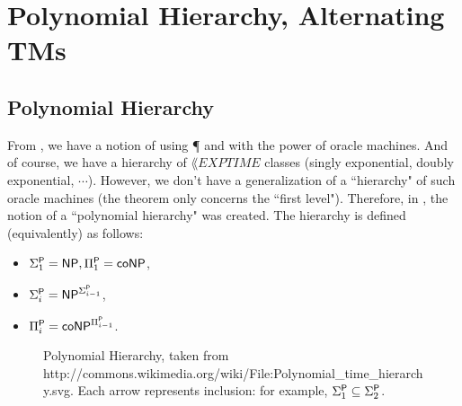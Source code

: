 \section{Polynomial Hierarchy, Alternating TMs}

\subsection{Polynomial Hierarchy}

From , we have a notion of using {\P} and {\NP} with the power of oracle machines. And of course, we have a hierarchy of $\lang{EXPTIME}$ classes (singly exponential, doubly exponential, $\cdots$). However, we don't have a generalization of a ``hierarchy" of such oracle machines (the theorem only concerns the ``first level"). Therefore, in \cite{originalpolyhierarchypaper}, the notion of a ``polynomial hierarchy" was created. The hierarchy is defined (equivalently) as follows:
\begin{itemize}
\item $\Sigma_1^\P = \NP, \Pi_1^\P = \coNP$,
\item $\Sigma_i^\P = \NP^{\Sigma_{i-1}^\P}$, 
\item $\Pi_i^\P = \coNP^{\Pi_{i-1}^\P}$.
\end{itemize}

\begin{figure}[!htb]
\label{fig:polyhierarchy}
\caption{Polynomial Hierarchy, taken from http://commons.wikimedia.org/wiki/File:Polynomial\_time\_hierarchy.svg. Each arrow represents inclusion: for example, $\Sigma_1^\P \subseteq \Sigma_2^\P$.}
\centering
{}
\end{figure}

